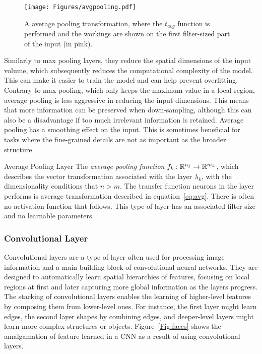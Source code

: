 \begin{figure}[ht!]
	\begin{center}
		\texttt{[image: Figures/avgpooling.pdf]}
	\end{center}
	\caption{A average pooling transformation, where the $t_{avg}$ function is performed and the workings are shown on the first filter-sized part of the input (in pink).}
	\label{Fig:avg}
\end{figure} 
Similarly to max pooling layers,  they reduce the spatial dimensions of the input volume, which subsequently reduces the computational complexity of the model. This can make it easier to train the model and can help prevent overfitting. Contrary to max pooling, which only keeps the maximum value in a local region, average pooling is less aggressive in reducing the input dimensions. This means that more information can be preserved when down-sampling, although this can also be a disadvantage if too much irrelevant information is retained. Average pooling has a smoothing effect on the input. This is sometimes beneficial for tasks where the fine-grained details are not as important as the broader structure. 

\begin{Definition}{Average Pooling Layer}{}
The \emph{average pooling function} $f_k:\mathbb{R}^{n_j}\to \mathbb{R}^{m_k}$, which describes the vector transformation associated with the layer $\lambda_k$, with the dimensionality conditions that $n > m$. The transfer function neurons in the layer performs is average transformation described in equation~\eqref{eq:avg}. There is often no activation function that follows. This type of layer has an associated filter size and no learnable parameters.
\end{Definition}
\subsubsection{Convolutional Layer}
\label{sec:conv}
Convolutional layers are a type of layer often used for processing image information and a main building block of convolutional neural networks. They are designed to automatically learn spatial hierarchies of features, focusing on local regions at first and later capturing more global information as the layers progress. The stacking of convolutional layers enables the learning of higher-level features by composing them from lower-level ones. For instance, the first layer might learn edges, the second layer shapes by combining edges, and deeper-level layers might learn more complex structures or objects. Figure~\ref{Fig:faces} shows the amalgamation of feature learned in a CNN as a result of using convolutional layers.

